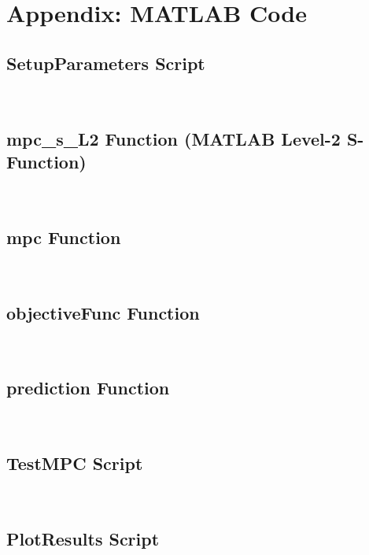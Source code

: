 \documentclass[12pt]{article}
\begin{document}



\section{Appendix: MATLAB Code}
\label{code:Appendix}

\subsection{SetupParameters Script}
\label{code:Setup}

\,

\subsection{mpc\_s\_L2 Function (MATLAB Level-2 S-Function)}
\label{code:mpcL2}

\,

\subsection{mpc Function}
\label{code:mpc}

\,

\subsection{objectiveFunc Function}
\label{code:objectiveFunc}

\,

\subsection{prediction Function}
\label{code:prediction}

\,

\subsection{TestMPC Script}
\label{code:TestMPC}

\,

\subsection{PlotResults Script}
\label{code:PlotResults}

\,
\end{document}
